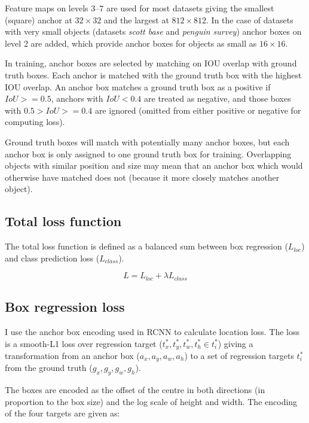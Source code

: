 Feature maps on levels $3$--$7$ are used for most datasets giving the smallest (square) anchor at $32\times32$ and the largest at $812\times812$. In the case of datasets with very small objects (datasets \emph{scott base} and \emph{penguin survey}) anchor boxes on level 2 are added, which provide anchor boxes for objects as small as $16 \times 16$.

In training, anchor boxes are selected by matching on \gls{IOU} overlap with ground truth boxes. Each anchor is matched with the ground truth box with the highest \gls{IOU} overlap. An anchor box matches a ground truth box as a positive if $ IoU >= 0.5 $, anchors with $ IoU < 0.4 $ are treated as negative, and those boxes with $ 0.5 > IoU >= 0.4 $ are ignored (omitted from either positive or negative for computing loss).

Ground truth boxes will match with potentially many anchor boxes, but each anchor box is only assigned to one ground truth box for training.  Overlapping objects with similar position and size may mean that an anchor box which would otherwise have matched does not (because it more closely matches another object).

\subsection{Total loss function}

The total loss function is defined as a balanced sum between box regression ($L_{loc}$) and class prediction loss ($L_{class}$). 

\begin{equation}
L  = L_{loc} + \lambda L_{class}
\label{eq:loss_total}
\end{equation}

\subsection {Box regression loss}
\label{sec:regression}


I use the anchor box encoding used in \gls{RCNN} \cite{Wang2017} to calculate location loss. The loss is a smooth-L1 loss over regression target ($t^*_x, t^*_y, t^*_w, t^*_h \in t^*_i$) giving a transformation from an anchor box ($a_x, a_y, a_w, a_h$)  to a set of regression targets $t^*_i$ from the ground truth ($g_x, g_y, g_w, g_h$). 

The boxes are encoded as the offset of the centre in both directions (in proportion to the box size) and the log scale of height and width. The encoding of the four targets are given as:

